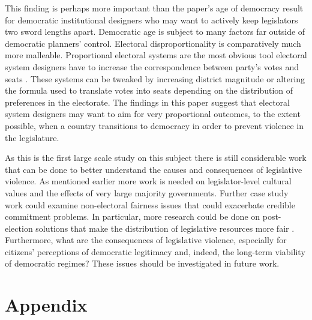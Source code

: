 \documentclass[a4paper]{article}\usepackage[]{graphicx}\usepackage[]{color}
\begin{document}
This finding is perhaps more important than the paper's age of democracy result for democratic institutional designers who may want to actively keep legislators two sword lengths apart. Democratic age is subject to many factors far outside of democratic planners' control. Electoral disproportionality is comparatively much more malleable. Proportional electoral systems are the most obvious tool electoral system designers have to increase the correspondence between party's votes and seats \citep{Carey2011}. These systems can be tweaked by increasing district magnitude or altering the formula used to translate votes into seats depending on the distribution of preferences in the electorate. The findings in this paper suggest that electoral system designers may want to aim for very proportional outcomes, to the extent possible, when a country transitions to democracy in order to prevent violence in the legislature. 

As this is the first large scale study on this subject there is still considerable work that can be done to better understand the causes and consequences of legislative violence. As mentioned earlier more work is needed on legislator-level cultural values and the effects of very large majority governments. Further case study work could examine non-electoral fairness issues that could exacerbate credible commitment problems. In particular, more research could be done on post-election solutions that make the distribution of legislative resources more fair \cite[for example see][who examined informal minority party access to power in Japan's Diet]{Wolfe2004}. Furthermore, what are the consequences of legislative violence, especially for citizens' perceptions of democratic legitimacy and, indeed, the long-term viability of democratic regimes? These issues should be investigated in future work. 





\theendnotes


\clearpage
\section*{Appendix}
\end{document}
